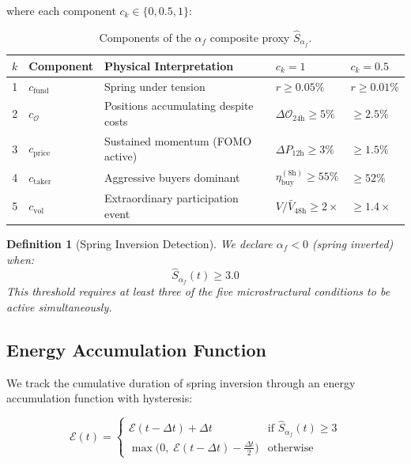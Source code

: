 \documentclass[11pt,a4paper]{article}
\newtheorem{definition}{Definition}[section]
\newcommand{\af}{\alpha_f}
\newcommand{\OI}{\mathcal{O}}
\begin{document}
\noindent where each component $c_k \in \{0, 0.5, 1\}$:

\begin{table}[H]
\centering
\caption{Components of the $\af$ composite proxy $\hat{S}_{\af}$.}
\label{tab:components}
\renewcommand{\arraystretch}{1.4}
\begin{tabularx}{\textwidth}{clXll}
\toprule
$k$ & Component & Physical Interpretation & $c_k = 1$ & $c_k = 0.5$ \\
\midrule
1 & $c_{\mathrm{fund}}$ & Spring under tension 
    & $r \ge 0.05\%$ & $r \ge 0.01\%$ \\
2 & $c_{\OI}$ & Positions accumulating despite costs 
    & $\Delta\OI_{24\text{h}} \ge 5\%$ & $\ge 2.5\%$ \\
3 & $c_{\mathrm{price}}$ & Sustained momentum (FOMO active) 
    & $\Delta P_{12\text{h}} \ge 3\%$ & $\ge 1.5\%$ \\
4 & $c_{\mathrm{taker}}$ & Aggressive buyers dominant 
    & $\eta_{\mathrm{buy}}^{(8\text{h})} \ge 55\%$ & $\ge 52\%$ \\
5 & $c_{\mathrm{vol}}$ & Extraordinary participation event 
    & $V/\bar{V}_{48\text{h}} \ge 2\times$ & $\ge 1.4\times$ \\
\bottomrule
\end{tabularx}
\end{table}

\begin{definition}[Spring Inversion Detection]
\label{def:inversion}
We declare $\hat{\af} < 0$ (spring inverted) when:
\begin{equation}
\label{eq:detection}
\hat{S}_{\af}(t) \ge 3.0
\end{equation}
This threshold requires at least three of the five microstructural conditions 
to be active simultaneously.
\end{definition}


\subsection{Energy Accumulation Function}

We track the cumulative duration of spring inversion through an energy 
accumulation function with hysteresis:

\begin{equation}
\label{eq:energy_func}
\mathcal{E}(t) = 
\begin{cases}
\mathcal{E}(t-\Delta t) + \Delta t & \text{if } \hat{S}_{\af}(t) \ge 3 \\[4pt]
\max\bigl(0,\; \mathcal{E}(t-\Delta t) - \tfrac{\Delta t}{2}\bigr) & \text{otherwise}
\end{cases}
\end{equation}
\end{document}

